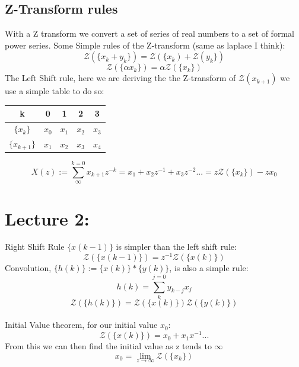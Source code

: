 \documentclass[a4paper,11pt]{article}
\begin{document}
	\subsection{Z-Transform rules}
		With a Z transform we convert a set of series of real numbers to a set of formal power series.
	Some Simple rules of the Z-transform (same as laplace I think):
		\begin{equation}
		    \mathcal{Z}(\{x_{k}+y_{k}\}) = \mathcal{Z}(\{x_{k})+\mathcal{Z}(y_{k}\})
		\end{equation}
		\begin{equation}
		    \mathcal{Z}(\{\alpha x_{k}\}) = \alpha\mathcal{Z}(\{x_{k}\})
		\end{equation}
	The Left Shift rule, here we are deriving the the Z-transform of $\mathcal{Z}(x_{k+1})$ we use a simple table to do so:
	

	\begin{center}
	\begin{tabular}{ |c|c|c|c|c| } 
	 \hline
	 k & 0 & 1 &2&3\\ 
	 \hline
	 $\{x_{k}\}$& $x_{0}$ & $x_{1}$& $x_{2}$& $x_{3}$\\ 
	\hline	 
	 $\{x_{k+1}\}$& $x_{1}$& $x_{2}$& $x_{3}$& $x_{4}$\\ 
	 \hline
	\end{tabular}
	\end{center}
	\begin{equation}
		X(z):= \sum\limits_{\infty}^{k=0}x_{k+1}z^{-k}=	x_{1} + x_{2}z^{-1} +x_{3}z^{-2}...= z\mathcal{Z}(\{x_k\})-zx_0
	\end{equation}
\section{Lecture 2:}
	Right Shift Rule $\{x(k-1)\}$ is simpler than the left shift rule:
	\begin{equation}
		\mathcal{Z}(\{x(k-1)\})=z^{-1}\mathcal{Z}(\{x(k)\})
	\end{equation}
	Convolution, $\{h(k)\}:=\{x(k)\}*\{y(k)\}$, is also a simple rule:
	\begin{equation}
		h(k) = \sum\limits_{k}^{j=0}y_{k-j}x_j
	\end{equation}
	\begin{equation}
		\mathcal{Z}(\{h(k)\})=\mathcal{Z}(\{x(k)\})\mathcal{Z}(\{y(k)\})
	\end{equation}\\
	Initial Value theorem, for our initial value $x_0$:
	\begin{equation}
		\mathcal{Z}(\{x(k)\})=x_0+x_1x^{-1}...
	\end{equation}
	From this we can then find the initial value as z tends to $\infty$ 
	\begin{equation}
		x_0=\lim\limits_{z \rightarrow \infty}\mathcal{Z}(\{x_k\})
	\end{equation}
\end{document}

